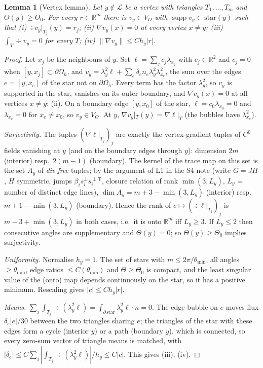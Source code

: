\documentclass[11pt]{article}
\newtheorem{lemma}[theorem]{Lemma}
\theoremstyle{remark}
\newcommand{\VO}{V_O}
\newcommand{\Lk}{\mathcal L}
\newcommand{\norm}[1]{\|#1\|}
\begin{document}
\begin{lemma}[Vertex lemma]\label{lem:V}
Let $y\notin\Lk$ be a vertex with triangles $T_1,\dots,T_m$ and $\Theta(y)\ge\Theta_0$. For every
$r\in\mathbb R^m$ there is $v_y\in\VO$ with $\operatorname{supp}v_y\subset\mathrm{star}(y)$ such that
(i) $\div v_y|_{T_j}(y)=r_j$; (ii) $\nabla v_y(x)=0$ at every vertex $x\ne y$; (iii) $\int_T\div v_y=0$ for every $T$;
(iv) $\norm{\nabla v_y}\le Ch_y|r|$.
\end{lemma}
\begin{proof}
Let $x_j$ be the neighbours of $y$. Set $\ell=\sum_jc_j\lambda_{x_j}$ with $c_j\in\mathbb R^2$ and $c_j=0$ when
$[y,x_j]\subset\partial\Omega_h$, and $v_y=\lambda_y^2\ell+\sum_e\delta_e n_e\lambda_y^2\lambda_{x_e}^2$, the sum over the
edges $e=[y,x_e]$ of the star not on $\partial\Omega_h$. Every term has the factor $\lambda_y^2$, so $v_y$ is supported in the
star, vanishes on its outer boundary, and $\nabla v_y(x)=0$ at all vertices $x\ne y$: (ii). On a boundary edge
$[y,x_0]$ of the star, $\ell=c_0\lambda_{x_0}=0$ and $\lambda_{x_e}=0$ for $x_e\ne x_0$, so $v_y\in\VO$.
At $y$, $\nabla v_y|_{T}(y)=\nabla\ell|_T$ (the bubbles have $\lambda_{x_e}^2$).

\emph{Surjectivity.} The tuples $(\nabla\ell|_{T_j})_j$ are exactly the vertex-gradient tuples of $C^0$ fields
vanishing at $y$ (and on the boundary edges through $y$): dimension $2m$ (interior) resp.\ $2(m-1)$ (boundary).
The kernel of the trace map on this set is the set $A_y$ of \emph{div-free} tuples; by the argument of L1 in the S4
note (write $G=JH$, $H$ symmetric, jumps $\beta_is_i^\perp s_i^{\perp\mathsf T}$, closure relation of rank
$\min(3,L_y)$, $L_y$ = number of distinct edge lines), $\dim A_y=m+3-\min(3,L_y)$ (interior) resp.
$m+1-\min(3,L_y)$ (boundary). Hence the rank of $c\mapsto(\div\ell|_{T_j})_j$ is $m-3+\min(3,L_y)$ in both
cases, i.e.\ it is onto $\mathbb R^m$ iff $L_y\ge3$. If $L_y\le2$ then consecutive angles are supplementary and
$\Theta(y)=0$; so $\Theta(y)\ge\Theta_0$ implies surjectivity.

\emph{Uniformity.} Normalise $h_y=1$. The set of stars with $m\le2\pi/\theta_{\min}$, all angles
$\ge\theta_{\min}$, edge ratios $\le C(\theta_{\min})$ and $\Theta\ge\Theta_0$ is compact, and the least singular value
of the (onto) map depends continuously on the star, so it has a positive minimum. Rescaling gives $|c|\le Ch_y|r|$.

\emph{Means.} $\sum_j\int_{T_j}\div(\lambda_y^2\ell)=\int_{\partial\,\mathrm{star}}\lambda_y^2\ell\cdot n=0$. The edge bubble on
$e$ moves flux $\delta_e|e|/30$ between the two triangles sharing $e$; the triangles of the star with these edges
form a cycle (interior $y$) or a path (boundary $y$), which is connected, so every zero-sum vector of triangle
means is matched, with $|\delta_e|\le C\sum_j|\int_{T_j}\div(\lambda_y^2\ell)|/h_y\le C|c|$. This gives (iii), (iv).
\end{proof}
\end{document}
